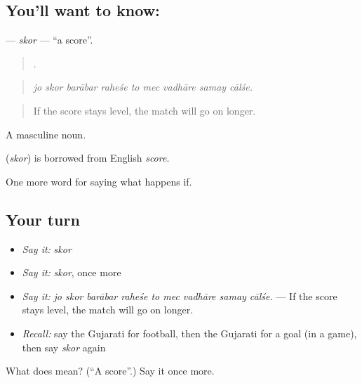 \subsection*{You'll want to know: }
\textbf{} — \emph{skor} — \textquotedblleft{}a score\textquotedblright{}.

\begin{quote}
        .
\end{quote}

\begin{quote}
\emph{jo skor barābar raheśe to mec vadhāre samay cālśe.}
\end{quote}

\begin{quote}
If the score stays level, the match will go on longer.
\end{quote}

A masculine noun.

\begin{cousinweb}
\textbf{} (\emph{skor}) is borrowed from English \emph{score}.
\end{cousinweb}

\begin{grammarlens}[title={What you've built}]
One more word for saying what happens if.
\end{grammarlens}

\subsection*{Your turn}
\begin{itemize}
\raggedright
  \item \emph{Say it:} \emph{skor}
  \item \emph{Say it:} \emph{skor}, once more
  \item \emph{Say it:} \emph{jo skor barābar raheśe to mec vadhāre samay cālśe.} — If the score stays level, the match will go on longer.
  \item \emph{Recall:} say the Gujarati for football, then the Gujarati for a goal (in a game), then say \emph{skor} again
\end{itemize}

\begin{tcolorbox}[breakable,colback=teal!4,colframe=teal!35!black,title={Before you move on}]
What does  mean? (\textquotedblleft{}A score\textquotedblright{}.) Say it once more.
\end{tcolorbox}
